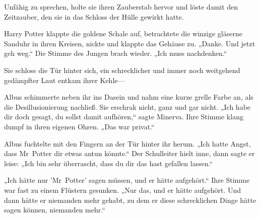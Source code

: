 Unfähig zu sprechen, holte sie ihren Zauberstab hervor und löste damit den Zeitzauber, den sie in das Schloss der Hülle gewirkt hatte.

Harry Potter klappte die goldene Schale auf, betrachtete die winzige gläserne Sanduhr in ihren Kreisen, nickte und klappte das Gehäuse zu. „Danke. Und jetzt geh weg.“ Die Stimme des Jungen brach wieder. „Ich muss nachdenken.“

\later

Sie schloss die Tür hinter sich, ein schrecklicher und immer noch weitgehend gedämpfter Laut entkam ihrer Kehle—


Albus schimmerte neben ihr ins Dasein und nahm eine kurze grelle Farbe an, als die Desillusionierung nachließ. Sie erschrak nicht, ganz und gar nicht. „Ich habe dir doch gesagt, du sollst damit aufhören,“ sagte Minerva. Ihre Stimme klang dumpf in ihren eigenen Ohren. „Das war privat.“

Albus fuchtelte mit den Fingern an der Tür hinter ihr herum. „Ich hatte Angst, dass Mr~Potter dir etwas antun könnte.“ Der Schulleiter hielt inne, dann sagte er leise: „Ich bin sehr überrascht, dass du dir das hast gefallen lassen.“

„Ich hätte nur 'Mr~Potter' sagen müssen, und er hätte aufgehört.“
Ihre Stimme war fast zu einem Flüstern gesunken.
„Nur das, und er hätte aufgehört. Und dann hätte er niemanden mehr gehabt, zu dem er diese schrecklichen Dinge hätte sagen können, niemanden mehr.“

